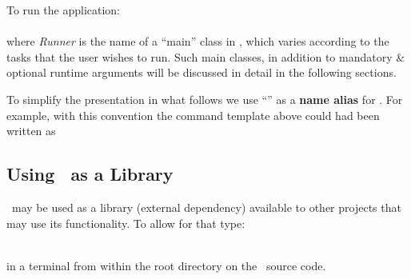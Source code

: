 \noindent To run the application: \\

\noindent {} \\

\noindent where \emph{Runner} is the name of a ``main'' class in \trail, which varies according to the tasks that the user wishes to run. Such main classes, in addition to mandatory \& optional runtime arguments will be discussed in detail in the following sections. \\

\begin{remark}
	To simplify the presentation in what follows we use ``'' as a \textbf{name alias} for  . For example, with this convention the command template above could had been written as \\
	
	\noindent {}
\end{remark}

\subsection{Using \trail \  as a Library}
\trail \ may be used as a library (external dependency) available to other projects that may use its functionality. To allow for that type:

\noindent {} \\

\noindent in a terminal from within the root directory on the \trail \ source code.

\newpage

 


